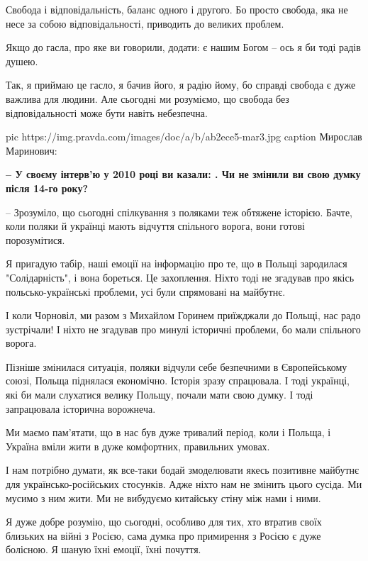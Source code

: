 Свобода і відповідальність, баланс одного і другого. Бо просто свобода, яка не
несе за собою відповідальності, приводить до великих проблем.

Якщо до гасла, про яке ви говорили, додати:  є
нашим Богом – ось я би тоді радів душею. 

Так, я приймаю це гасло, я бачив його, я радію йому, бо справді свобода є дуже
важлива для людини. Але сьогодні ми розуміємо, що свобода без відповідальності
може бути навіть небезпечна.

\ifcmt
pic https://img.pravda.com/images/doc/a/b/ab2ece5-mar3.jpg 
caption Мирослав Маринович: 
\fi

\textbf{– У своєму інтерв’ю у 2010 році ви казали: . Чи не змінили ви свою думку після 14-го року?}

– Зрозуміло, що сьогодні спілкування з поляками теж обтяжене історією. Бачте,
коли поляки й українці мають відчуття спільного ворога, вони готові
порозумітися. 

Я пригадую табір, наші емоції на інформацію про те, що в Польщі зародилася
"Солідарність", і вона бореться. Це захоплення. Ніхто тоді не згадував про
якісь польсько-українські проблеми, усі були спрямовані на майбутнє.

І коли Чорновіл, ми разом з Михайлом Горинем приїжджали до Польщі, нас радо
зустрічали! І ніхто не згадував про минулі історичні проблеми, бо мали
спільного ворога. 

Пізніше змінилася ситуація, поляки відчули себе безпечними в Європейському
союзі, Польща піднялася економічно. Історія зразу спрацювала. І тоді українці,
які би мали слухатися велику Польщу, почали мати свою думку. І тоді запрацювала
історична ворожнеча. 

Ми маємо пам’ятати, що в нас був дуже тривалий період, коли і Польща, і Україна
вміли жити в дуже комфортних, правильних умовах. 

І нам потрібно думати, як все-таки бодай змоделювати якесь позитивне майбутнє
для українсько-російських стосунків. Адже ніхто нам не змінить цього сусіда. Ми
мусимо з ним жити. Ми не вибудуємо китайську стіну між нами і ними. 

Я дуже добре розумію, що сьогодні, особливо для тих, хто втратив своїх близьких
на війні з Росією, сама думка про примирення з Росією є дуже болісною. Я шаную
їхні емоції, їхні почуття. 

